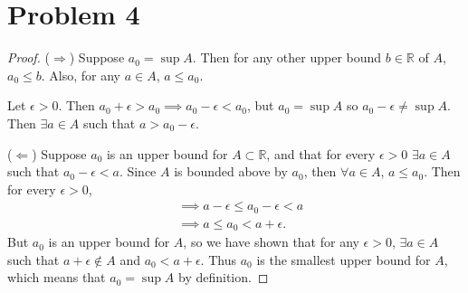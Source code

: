 \documentclass{article}
\begin{document}
\section*{Problem 4}
\begin{proof}
	($\Rightarrow$) Suppose $a_0 = \sup{A}$. Then for any other upper bound $b \in \mathbb{R}$ of $A$, $a_0 \leq b$. Also, for any $a\in A$, $a \leq a_0$.
	
	Let $\epsilon>0$. Then $a_0 + \epsilon > a_0 \implies a_0 - \epsilon < a_0$, but $a_0 = \sup{A}$ so $a_0 - \epsilon \neq \sup{A}$.  Then $\exists a \in A$ such that $a>a_0 - \epsilon$.
	
	($\Leftarrow$) Suppose $a_0$ is an upper bound for $A\subset\mathbb{R}$, and that for every $\epsilon > 0$ $\exists a\in A$ such that $a_0 - \epsilon < a$. Since $A$ is bounded above by $a_0$, then $\forall a \in A$, $a\leq a_0$. Then for every $\epsilon>0$,
	\begin{align}
		&\implies a-\epsilon \leq a_0 - \epsilon < a \\
		&\implies a \leq a_0 < a + \epsilon. 
	\end{align}
	But $a_0$ is an upper bound for $A$, so we have shown that for any $\epsilon>0$, $\exists a \in A$ such that $a+\epsilon \notin A$ and $a_0 < a + \epsilon$. Thus $a_0$ is the smallest upper bound for $A$, which means that $a_0=\sup{A}$ by definition.
\end{proof}
\end{document}

